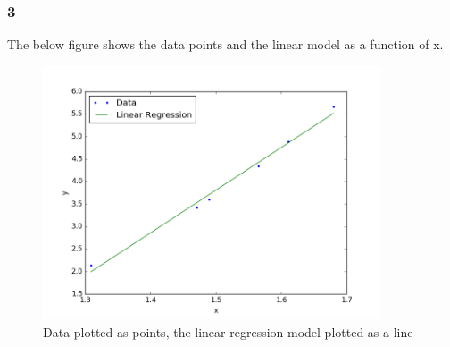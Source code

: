 \documentclass{article}
\begin{document}
\subsubsection{3}
The below figure shows the data points and the linear model as a function of x.
\begin{figure}[H]
  \centering
  \includegraphics[width=10cm]{ass5.png}
  \caption{Data plotted as points, the linear regression model plotted as a line}
  \label{fig:boat1}
\end{figure}
\end{document}
